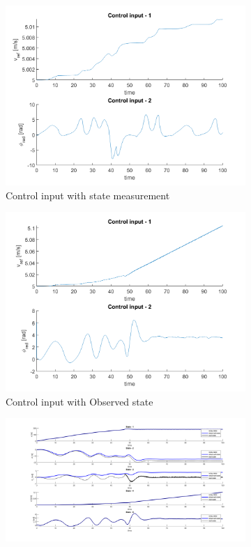 \begin{figure}[H]
\begin{subfigure}[b]{0.47\textwidth}
         \centering
         \includegraphics[width=\textwidth]{Latex report/image/ex2/input12.png}
         \caption{Control input with state measurement}
         \label{fig:input31}
     \end{subfigure}
     \begin{subfigure}[b]{0.47\textwidth}
         \centering
         \includegraphics[width=\textwidth]{Latex report/image/ex2/input2.png}
         \caption{Control input with Observed state}
         \label{fig:input32}
     \end{subfigure}
     \begin{subfigure}[b]{0.95\textwidth}
         \centering
         \includegraphics[width=\textwidth]{Latex report/image/ex2/obs2.png}

\end{subfigure}
\end{figure}
